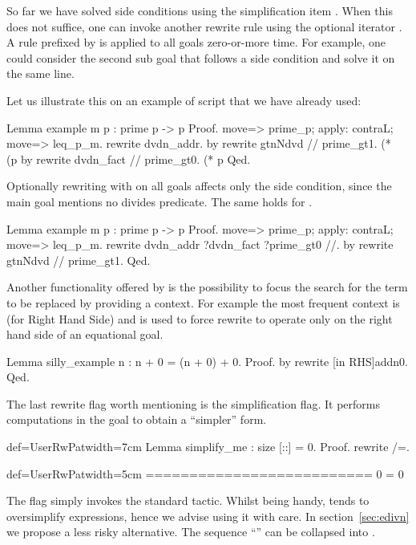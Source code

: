 So far we have solved side conditions using the simplification item \C{//}.
When this does not suffice, one can invoke another rewrite rule using
the optional iterator .  A rule prefixed by  is applied to
all goals zero-or-more time.  For example, one could consider the
second sub goal that follows  a side condition
and solve it on the same line.

Let us illustrate this on an example of script that we have already used:

\begin{coq}{}{}
Lemma example m p : prime p -> p %
Proof.
move=> prime_p; apply: contraL; move=> leq_p_m.
rewrite dvdn_addr.
  by rewrite gtnNdvd // prime_gt1. (* ~~ (p %
by rewrite dvdn_fact // prime_gt0. (* p %
Qed.
\end{coq}

Optionally rewriting with  on all goals affects only
the side condition, since the main goal mentions no divides predicate.
The same holds for .

\begin{coq}{}{}
Lemma example m p : prime p -> p %
Proof.
move=> prime_p; apply: contraL; move=> leq_p_m.
rewrite dvdn_addr ?dvdn_fact ?prime_gt0 //.
by rewrite gtnNdvd // prime_gt1.
Qed.
\end{coq}

Another functionality offered by  is the possibility
to focus the search for the term to be replaced by providing a
context.  For example the most frequent context is  (for Right
Hand Side) and is used to force rewrite to operate only on the right
hand side of an equational goal.

\begin{coq}{}{}
Lemma silly_example n : n + 0 = (n + 0) + 0.
Proof. by rewrite [in RHS]addn0. Qed.
\end{coq}


The last rewrite flag worth mentioning is the \C{/=} simplification
flag.  It performs computations in the goal to obtain a ``simpler'' form.

\begin{coq}{def=UserRwPat}{width=7cm}
Lemma simplify_me : size [::] = 0.
Proof.
rewrite /=.
\end{coq}
\begin{coqout}{def=UserRwPat}{width=5cm}
==========================
0 = 0
\end{coqout}
The \C{/=} flag simply invokes the \Coq{} standard 
tactic.  Whilst being handy,  tends to oversimplify
expressions, hence we advise using it with care.
In section~\ref{sec:edivn} we propose a less risky alternative.
The sequence ``\C{// /=}'' can be collapsed into \C{//=}.

